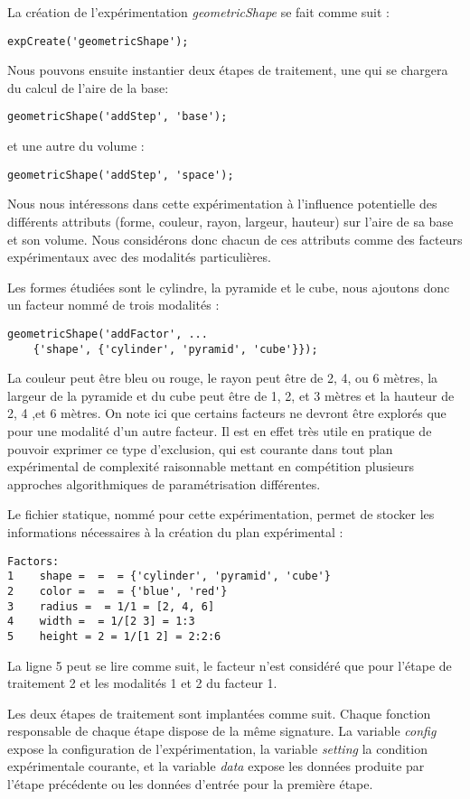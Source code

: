 La création de l'expérimentation \textsl{geometricShape} se fait comme suit :
\begin{lstlisting}
expCreate('geometricShape');
\end{lstlisting}
Nous pouvons ensuite instantier deux étapes de traitement, une qui se chargera du calcul de l'aire de la base:
\begin{lstlisting}
geometricShape('addStep', 'base');
\end{lstlisting}
et une autre du volume :
\begin{lstlisting}
geometricShape('addStep', 'space');
\end{lstlisting}
Nous nous intéressons dans cette expérimentation à l'influence potentielle des différents attributs (forme, couleur, rayon, largeur, hauteur) sur l'aire de sa base et son volume. Nous considérons donc chacun de ces attributs comme des facteurs expérimentaux avec des modalités particulières.

Les formes étudiées sont le cylindre, la pyramide et le cube, nous ajoutons donc un facteur nommé  de trois modalités :
\begin{lstlisting}
geometricShape('addFactor', ...
	{'shape', {'cylinder', 'pyramid', 'cube'}});
\end{lstlisting}
La couleur peut être bleu ou rouge, le rayon peut être de 2, 4, ou 6 mètres, la largeur de la pyramide et du cube peut être de 1, 2, et 3 mètres et la hauteur de 2, 4 ,et 6 mètres. On note ici que certains facteurs ne devront être explorés que pour une modalité d'un autre facteur. Il est en effet très utile en pratique de pouvoir exprimer ce type d'exclusion, qui est courante dans tout plan expérimental de complexité raisonnable mettant en compétition plusieurs approches algorithmiques de paramétrisation différentes.

Le fichier statique, nommé  pour cette expérimentation, permet de stocker les informations nécessaires à la création du plan expérimental :
\begin{lstlisting}
Factors:
1    shape =  =  = {'cylinder', 'pyramid', 'cube'}
2    color =  =  = {'blue', 'red'}
3    radius =  = 1/1 = [2, 4, 6]
4    width =  = 1/[2 3] = 1:3
5    height = 2 = 1/[1 2] = 2:2:6
\end{lstlisting}
La ligne 5 peut se lire comme suit, le facteur  n'est considéré que pour l'étape de traitement 2 et les modalités 1 et 2 du facteur 1.

Les deux étapes de traitement sont implantées comme suit. Chaque fonction responsable de chaque étape dispose de la même signature. La variable \textsl{config} expose la configuration de l'expérimentation, la variable \textsl{setting} la condition expérimentale courante, et la variable \textsl{data} expose les données produite par l'étape précédente ou les données d'entrée pour la première étape.

